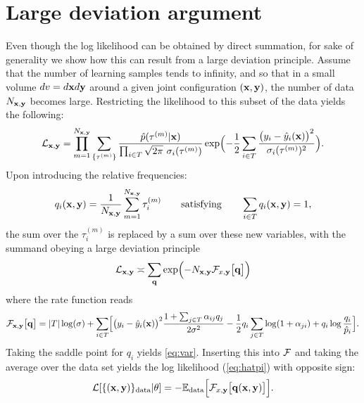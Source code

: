 \section*{Large deviation argument}
Even though the log likelihood can be obtained by direct summation, for sake of 
generality we show how this can result from a large deviation principle.
Assume that the number of learning samples tends to infinity, and so that in a 
small volume $dv = d\mathbf{x} d{\bf y}$ around a given joint configuration 
$(\mathbf{x},{\bf y})$, the number of data $N_{\mathbf{x},{\bf y}}$ becomes large. 
Restricting the likelihood to this subset of the data yields the following:
\[
{\cal L}_{\mathbf{x},{\bf y}} = \prod_{m=1}^{N_{\mathbf{x},{\bf y}}} \sum_{\{\tau^{(m)}\}} 
\frac{\hat p(\tau^{(m)}\vert \mathbf{x})}{\prod_{i\in  T}\sqrt{2\pi}\ \sigma_i(\tau^{(m)})}
\exp\Bigl(-\frac{1}{2}\sum_{i\in  T}\frac{\bigl(y_i-\hat y_i(\mathbf{x})\bigr)^2}{\sigma_i(\tau^{(m)})^2}\Bigr).
\]
Upon introducing the relative frequencies:
\[
q_i(\mathbf{x},{\bf y}) = \frac{1}{N_{\mathbf{x},{\bf y}}}\sum_{m=1}^{N_{\mathbf{x},{\bf y}}} \tau_i^{(m)} 
\qquad\text{satisfying}\qquad 
\sum_{i\in  T} q_i(\mathbf{x},{\bf y}) = 1,
\]
the sum over the $\tau_i^{(m)}$ is replaced by a sum over these new variables, 
with the summand obeying a large deviation principle 
\[
{\cal L}_{\mathbf{x},{\bf y}} \asymp \sum_{{\bf q}} 
\exp\Bigl(-N_{\mathbf{x},{\bf y}} {\cal F}_{x,{\bf y}}\bigl[{\bf q}\bigr]\Bigr)
\]
where the rate function reads
\[
{\cal F}_{\mathbf{x},{\bf y}}\bigl[{\bf q}\bigr] = \vert T\vert\log(\sigma)+
\sum_{i\in  T}\Bigl[\bigl(y_i-\hat y_i(\mathbf{x})\bigr)^2\frac{1+\sum_{j\in  T}\alpha_{ij}q_j}{2\sigma^2}
-\frac{1}{2}q_i\sum_{j\in  T}\log(1+\alpha_{ji})+q_i\log\frac{q_i}{\hat p_i}\Bigr].
\]
Taking the saddle point for $q_i$ yields %
\cref{eq:var}. Inserting this into ${\cal F}$ and taking
the average over the data set yields the log likelihood (\cref{eq:hatpi}) with 
opposite sign:
\[
{\cal L}[\{(\mathbf{x},{\bf y})\}_{\rm data}\vert\theta]
 = -{\mathbb E}_{\rm data}\Bigl[{\cal F}_{x,{\bf y}}\bigl[{\bf q}(\mathbf{x},{\bf y})\bigr]\Bigr].
\]

